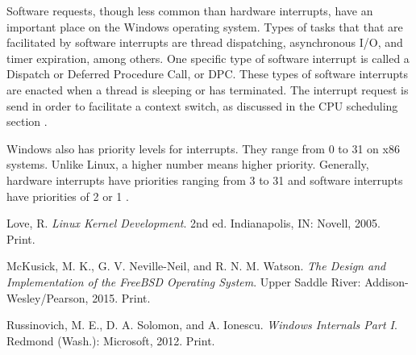 \documentclass[10pt,draftclsnofoot,onecolumn,journal,compsoc]{IEEEtran}
\begin{document}
Software requests, though less common than hardware interrupts, have an important place on the Windows operating system. Types of tasks that that are facilitated by software interrupts are thread dispatching, asynchronous I/O, and timer expiration, among others. One specific type of software interrupt is called a Dispatch or Deferred Procedure Call, or DPC. These types of software interrupts are enacted when a thread is sleeping or has terminated. The interrupt request is send in order to facilitate a context switch, as discussed in the CPU scheduling section \cite{win}.

Windows also has priority levels for interrupts. They range from 0 to 31 on x86 systems. Unlike Linux, a higher number means higher priority. Generally, hardware interrupts have priorities ranging from 3 to 31 and software interrupts have priorities of 2 or 1 \cite{win}. 
\newpage

\begin{thebibliography}{18}

Love, R. \textit{Linux Kernel Development}. 2nd ed. Indianapolis, IN: Novell, 2005. Print.

McKusick, M. K., G. V. Neville-Neil, and R. N. M. Watson. \textit{The Design and Implementation of the FreeBSD Operating System}. Upper Saddle River: Addison-Wesley/Pearson, 2015. Print.

Russinovich, M. E., D. A. Solomon, and A. Ionescu. \textit{Windows Internals Part I}. Redmond (Wash.): Microsoft, 2012. Print.
\end{thebibliography}
\end{document}
